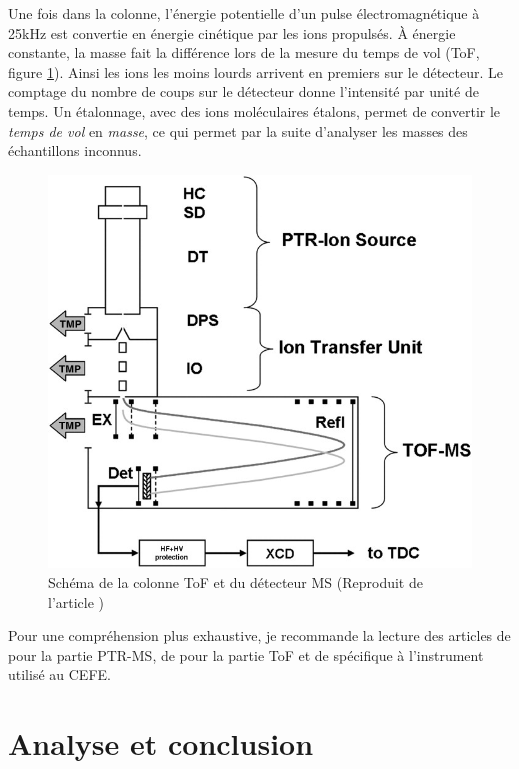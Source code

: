 \documentclass[
  12pt,
  american,
  a4paper,
  extrafontsizes,onecolumn,openright
  ]{memoir}
\begin{document}
Une fois dans la colonne, l'énergie potentielle d'un pulse électromagnétique à 25kHz est convertie en énergie cinétique par les ions propulsés. À énergie constante, la masse fait la différence lors de la mesure du temps de vol (ToF, figure \ref{fig:schemaToF}). Ainsi les ions les moins lourds arrivent en premiers sur le détecteur. Le comptage du nombre de coups sur le détecteur donne l'intensité par unité de temps. Un étalonnage, avec des ions moléculaires étalons, permet de convertir le \emph{temps de vol} en \emph{masse}, ce qui permet par la suite d'analyser les masses des échantillons inconnus.

\begin{figure}
\hypertarget{fig:schemaToF}{%
\centering
\includegraphics{images/schema_TOF.jpg}
\caption{Schéma de la colonne ToF et du détecteur MS (Reproduit de l'article \textcite{graus_2010})}\label{fig:schemaToF}
}
\end{figure}

Pour une compréhension plus exhaustive, je recommande la lecture des articles de \textcite{hansel_1995} pour la partie PTR-MS, de \textcite{graus_2010} pour la partie ToF et de \textcite{krechmer_2018} spécifique à l'instrument utilisé au CEFE.

\hypertarget{analyse-et-conclusion}{%
\section{Analyse et conclusion}\label{analyse-et-conclusion}}
\end{document}
